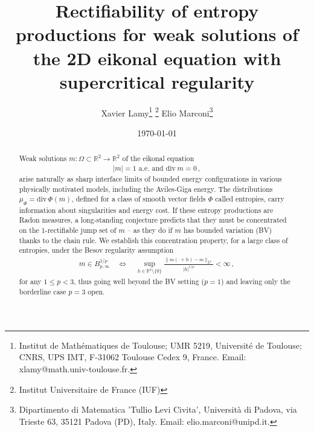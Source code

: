 \documentclass[fleqn
]{article}
\title{Rectifiability of entropy productions for weak solutions of the 2D eikonal equation with supercritical regularity}
\date{\today}
\author{Xavier Lamy\thanks{Institut de Math\'ematiques de Toulouse; UMR 5219, Universit\'e de Toulouse; CNRS, UPS IMT, F-31062 Toulouse Cedex 9, France. Email: xlamy@math.univ-toulouse.fr.}
\thanks{Institut Universitaire de France (IUF)}
 \qquad  Elio Marconi\thanks{Dipartimento di Matematica 'Tullio Levi Civita', Universit\`a di Padova, via Trieste 63, 35121 Padova (PD), Italy. Email: elio.marconi@unipd.it.}}
\numberwithin{equation}{section}
\newcommand{\R}{{\mathbb R}}
\DeclareMathOperator{\dv}{div}
\theoremstyle{definition}
\begin{document}
\maketitle

\begin{abstract}
%
%
Weak solutions $m\colon\Omega\subset\R^2\to\R^2$ of the eikonal equation
\begin{align*}
|m|=1\text{ a.e. and }\mathrm{div}\: m =0\,,
\end{align*}
arise naturally as sharp interface limits of bounded energy configurations in various physically motivated models, including the Aviles-Giga energy.
The distributions $\mu_\Phi=\mathrm{div}\,\Phi(m)$, defined for a class of smooth vector fields $\Phi$ called entropies,
carry information about singularities and energy cost.
If these entropy productions are Radon measures, a long-standing conjecture predicts that
 they must be concentrated on the 1-rectifiable jump set of $m$
 -- as they do if $m$ has bounded variation (BV) thanks to the chain rule. 
We establish this concentration property,
for a large class of entropies,
 under the Besov regularity assumption 
\begin{align*}
m\in B^{1/p}_{p,\infty} \quad
\Leftrightarrow
\quad
\sup_{h\in \mathbb R^2\setminus\lbrace 0\rbrace} \frac{\|m(\cdot +h)-m\|_{L^p
}
}{|h|^{1/p}} <\infty\,,
\end{align*}
for any $1\leq p<3$, thus going
 well beyond the BV setting ($p=1$) and leaving only the borderline case $p=3$ open.
%
\end{abstract}
\end{document}
